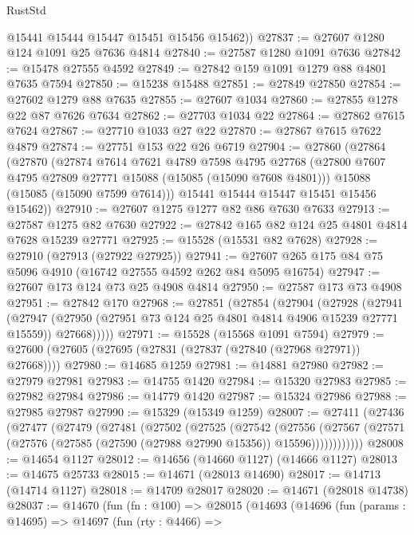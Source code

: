 \begin{lexlean}{RustStd}
\begin{coremodule}
        @15441
        @15444
        @15447
        @15451
        @15456
        @15462))
@27837 := @27607 @1280 @124 @1091 @25 @7636 @4814
@27840 := @27587 @1280 @1091 @7636
@27842 := @15478 @27555 @4592
@27849 := @27842 @159 @1091 @1279 @88 @4801 @7635 @7594
@27850 := @15238 @15488
@27851 := @27849 @27850
@27854 := @27602 @1279 @88 @7635
@27855 := @27607 @1034
@27860 := @27855 @1278 @22 @87 @7626 @7634
@27862 := @27703 @1034 @22
@27864 := @27862 @7615 @7624
@27867 := @27710 @1033 @27 @22
@27870 := @27867 @7615 @7622 @4879
@27874 := @27751 @153 @22 @26 @6719
@27904 := @27860
    (@27864
      (@27870
        (@27874
          @7614
          @7621
          @4789
          @7598
          @4795
          @27768
          (@27800 @7607 @4795 @27809 @27771 @15088 (@15085 (@15090 @7608 @4801)))
          @15088
          (@15085 (@15090 @7599 @7614)))
        @15441
        @15444
        @15447
        @15451
        @15456
        @15462))
@27910 := @27607 @1275 @1277 @82 @86 @7630 @7633
@27913 := @27587 @1275 @82 @7630
@27922 := @27842 @165 @82 @124 @25 @4801 @4814 @7628 @15239 @27771
@27925 := @15528 (@15531 @82 @7628)
@27928 := @27910 (@27913 (@27922 @27925))
@27941 := @27607 @265 @175 @84 @75 @5096 @4910 (@16742 @27555 @4592 @262 @84 @5095 @16754)
@27947 := @27607 @173 @124 @73 @25 @4908 @4814
@27950 := @27587 @173 @73 @4908
@27951 := @27842 @170
@27968 := @27851
    (@27854
      (@27904
        (@27928
          (@27941
            (@27947
              (@27950 (@27951 @73 @124 @25 @4801 @4814 @4906 @15239 @27771 @15559))
              @27668)))))
@27971 := @15528 (@15568 @1091 @7594)
@27979 := @27600 (@27605 (@27695 (@27831 (@27837 (@27840 (@27968 @27971)) @27668))))
@27980 := @14685 @1259
@27981 := @14881 @27980
@27982 := @27979 @27981
@27983 := @14755 @1420
@27984 := @15320 @27983
@27985 := @27982 @27984
@27986 := @14779 @1420
@27987 := @15324 @27986
@27988 := @27985 @27987
@27990 := @15329 (@15349 @1259)
@28007 := @27411
    (@27436
      (@27477
        (@27479
          (@27481
            (@27502
              (@27525
                (@27542
                  (@27556
                    (@27567
                      (@27571 (@27576 (@27585 (@27590 (@27988 @27990 @15356)) @15596))))))))))))
@28008 := @14654 @1127
@28012 := @14656 (@14660 @1127) (@14666 @1127)
@28013 := @14675 @25733
@28015 := @14671 (@28013 @14690)
@28017 := @14713 (@14714 @1127)
@28018 := @14709 @28017
@28020 := @14671 (@28018 @14738)
@28037 := @14670
    (fun (fn : @100) =>
    @28015
      (@14693
        (@14696
          (fun (params : @14695) =>
          @14697
            (fun (rty : @4466) =>

\end{coremodule}
\end{lexlean}
